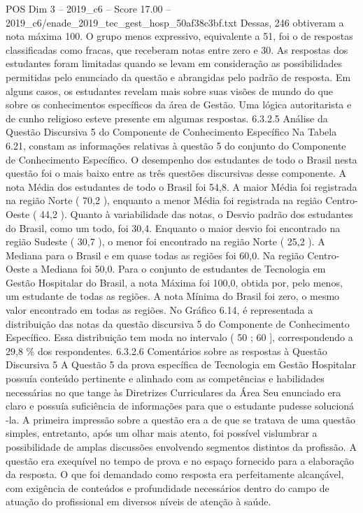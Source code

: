 \begin{textsample}{POS Dim 3 – 2019\_c6 – Score 17.00 – 2019\_c6/enade\_2019\_tec\_gest\_hosp\_50af38c3bf.txt}
Dessas, 246 obtiveram a nota máxima 100.
O grupo menos expressivo, equivalente a 51, foi o de respostas classificadas como fracas, que receberam notas entre zero e 30.
As respostas dos estudantes foram limitadas quando se levam em consideração as possibilidades permitidas pelo enunciado da questão e abrangidas pelo padrão de resposta.
Em alguns casos, os estudantes revelam mais sobre suas visões de mundo do que sobre os conhecimentos específicos da área de Gestão.
Uma lógica autoritarista e de cunho religioso esteve presente em algumas respostas. 6.3.2.5 Análise da Questão Discursiva 5 do Componente de Conhecimento Específico Na Tabela 6.21, constam as informações relativas à questão 5 do conjunto do Componente de Conhecimento Específico.
O desempenho dos estudantes de todo o Brasil nesta questão foi o mais baixo entre as três questões discursivas desse componente.
A nota Média dos estudantes de todo o Brasil foi 54,8.
A maior Média foi registrada na região Norte ( 70,2 ), enquanto a menor Média foi registrada na região Centro-Oeste ( 44,2 ).
Quanto à variabilidade das notas, o Desvio padrão dos estudantes do Brasil, como um todo, foi 30,4.
Enquanto o maior desvio foi encontrado na região Sudeste ( 30,7 ), o menor foi encontrado na região Norte ( 25,2 ).
A Mediana para o Brasil e em quase todas as regiões foi 60,0.
Na região Centro-Oeste a Mediana foi 50,0.
Para o conjunto de estudantes de Tecnologia em Gestão Hospitalar do Brasil, a nota Máxima foi 100,0, obtida por, pelo menos, um estudante de todas as regiões.
A nota Mínima do Brasil foi zero, o mesmo valor encontrado em todas as regiões.
No Gráfico 6.14, é representada a distribuição das notas da questão discursiva 5 do Componente de Conhecimento Específico.
Essa distribuição tem moda no intervalo ( 50 ; 60 ], correspondendo a 29,8 \% dos respondentes. 6.3.2.6 Comentários sobre as respostas à Questão Discursiva 5 A Questão 5 da prova específica de Tecnologia em Gestão Hospitalar possuía conteúdo pertinente e alinhado com as competências e habilidades necessárias no que tange às Diretrizes Curriculares da Área Seu enunciado era claro e possuía suficiência de informações para que o estudante pudesse solucioná -la.
A primeira impressão sobre a questão era a de que se tratava de uma questão simples, entretanto, após um olhar mais atento, foi possível vislumbrar a possibilidade de amplas discussões envolvendo segmentos distintos da profissão.
A questão era exequível no tempo de prova e no espaço fornecido para a elaboração da resposta.
O que foi demandado como resposta era perfeitamente alcançável, com exigência de conteúdos e profundidade necessários dentro do campo de atuação do profissional em diversos níveis de atenção à saúde.

\end{textsample}
